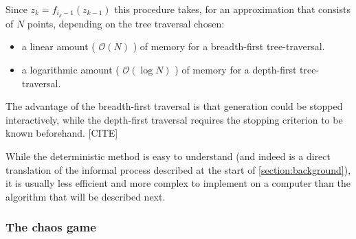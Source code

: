 \documentclass[11pt]{article}
\begin{document}
Since \(z_{k} = f_{i_k-1}(z_{k-1})\) this procedure takes, for an approximation that consists of \(N\) points, depending on the tree traversal chosen:

\begin{itemize}
\item a linear amount ( \(\mathcal{O}(N)\) ) of memory  for a breadth-first tree-traversal.
\item a logarithmic amount ( \(\mathcal{O}(\log{N})\) ) of memory for a depth-first tree-traversal.
\end{itemize}

The advantage of the breadth-first traversal is that generation could be stopped interactively,
while the depth-first traversal requires the stopping criterion to be known beforehand. [CITE]

While the deterministic method is easy to understand (and indeed is a direct translation of the informal process described at the start of \autoref{section:background}),
it is usually less efficient and more complex to implement on a computer than the algorithm that will be described next.

\subsubsection{The chaos game}
\label{sec:org9e7b017}
\label{subsection:chaos_game}
\end{document}
